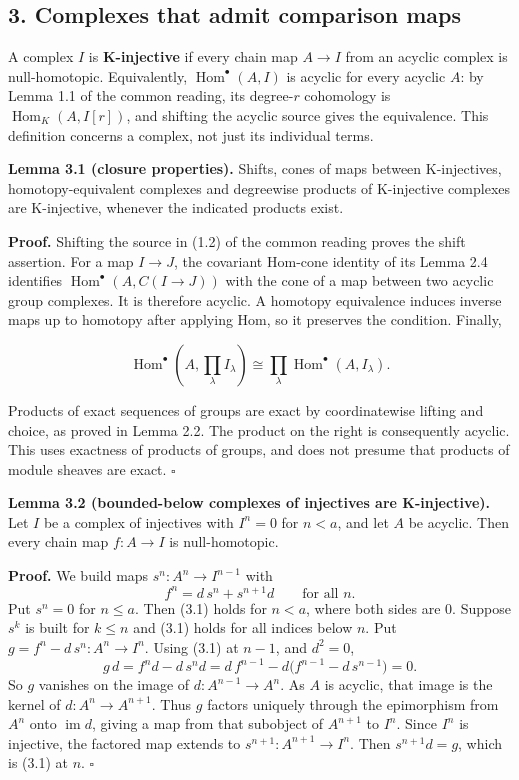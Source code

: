 \documentclass[
  english,
  11pt,
  a4paper,
]{article}
\begin{document}
\subsection{3. Complexes that admit comparison
maps}\label{injective-modules-and-bounded-below-derived-functors--3-complexes-that-admit-comparison-maps}

A complex \(I\) is \textbf{K-injective} if every chain map \(A\to I\)
from an acyclic complex is null-homotopic. Equivalently,
\(\operatorname{Hom}^{\bullet}(A,I)\) is acyclic for every acyclic
\(A\): by Lemma 1.1 of the common reading, its degree-\(r\) cohomology
is \(\operatorname{Hom}_K(A,I[r])\), and shifting the acyclic source
gives the equivalence. This definition concerns a complex, not just its
individual terms.

\textbf{Lemma 3.1 (closure properties).} Shifts, cones of maps between
K-injectives, homotopy-equivalent complexes and degreewise products of
K-injective complexes are K-injective, whenever the indicated products
exist.

\textbf{Proof.} Shifting the source in (1.2) of the common reading
proves the shift assertion. For a map \(I\to J\), the covariant Hom-cone
identity of its Lemma 2.4 identifies
\(\operatorname{Hom}^{\bullet}(A,C(I\to J))\) with the cone of a map
between two acyclic group complexes. It is therefore acyclic. A homotopy
equivalence induces inverse maps up to homotopy after applying Hom, so
it preserves the condition. Finally,

\[\operatorname{Hom}^{\bullet}\left(A,\prod_\lambda I_\lambda\right)
\cong\prod_\lambda\operatorname{Hom}^{\bullet}(A,I_\lambda).\]

Products of exact sequences of groups are exact by coordinatewise
lifting and choice, as proved in Lemma 2.2. The product on the right is
consequently acyclic. This uses exactness of products of groups, and
does not presume that products of module sheaves are exact. \(\square\)

\textbf{Lemma 3.2 (bounded-below complexes of injectives are
K-injective).} Let \(I\) be a complex of injectives with \(I^n=0\) for
\(n<a\), and let \(A\) be acyclic. Then every chain map \(f:A\to I\) is
null-homotopic.

\textbf{Proof.} We build maps \(s^n:A^n\to I^{n-1}\) with
\[f^n=d\,s^n+s^{n+1}d\qquad\text{for all }n .
\tag{3.1}\] Put \(s^n=0\) for \(n\leq a\). Then (3.1) holds for \(n<a\),
where both sides are \(0\). Suppose \(s^k\) is built for \(k\leq n\) and
(3.1) holds for all indices below \(n\). Put
\(g=f^n-d\,s^n:A^n\to I^n\). Using (3.1) at \(n-1\), and \(d^2=0\),
\[g\,d=f^nd-d\,s^nd=d\,f^{n-1}-d\bigl(f^{n-1}-d\,s^{n-1}\bigr)=0 .\] So
\(g\) vanishes on the image of \(d:A^{n-1}\to A^n\). As \(A\) is
acyclic, that image is the kernel of \(d:A^n\to A^{n+1}\). Thus \(g\)
factors uniquely through the epimorphism from \(A^n\) onto
\(\operatorname{im}d\), giving a map from that subobject of \(A^{n+1}\)
to \(I^n\). Since \(I^n\) is injective, the factored map extends to
\(s^{n+1}:A^{n+1}\to I^n\). Then \(s^{n+1}d=g\), which is (3.1) at
\(n\). \(\square\)
\end{document}

